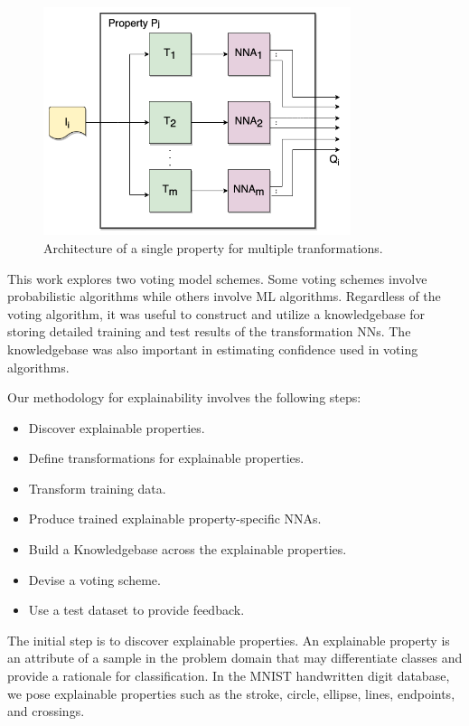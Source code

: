 \documentclass[conference]{IEEEtran}
\begin{document}
 \begin{figure}[htbp]
\centerline{\includegraphics[width=90mm]{./images/property_transforms.png}}
\caption{Architecture of a single property for multiple tranformations.}
\label{proptrans}
\end{figure}

This work explores two voting model schemes.  Some voting schemes involve probabilistic algorithms while others involve ML algorithms.  Regardless of the voting algorithm, it was useful to construct and utilize a knowledgebase for storing detailed training and test results of the transformation NNs.  The knowledgebase was also important in estimating confidence used in voting algorithms. 
 
Our methodology for explainability involves the following steps:
\begin{itemize}
\item Discover explainable properties.
\item Define transformations for explainable properties.
\item Transform training data.
\item Produce trained explainable property-specific NNAs.
\item Build a Knowledgebase across the explainable properties.
\item Devise a voting scheme.
\item Use a test dataset to provide feedback.
\end{itemize}

The initial step is to discover explainable properties.  An explainable property is an attribute of a sample in the problem domain that may differentiate classes and provide a rationale for classification.  In the MNIST handwritten digit database, we pose explainable properties such as the stroke, circle, ellipse, lines, endpoints, and crossings.
\end{document}
